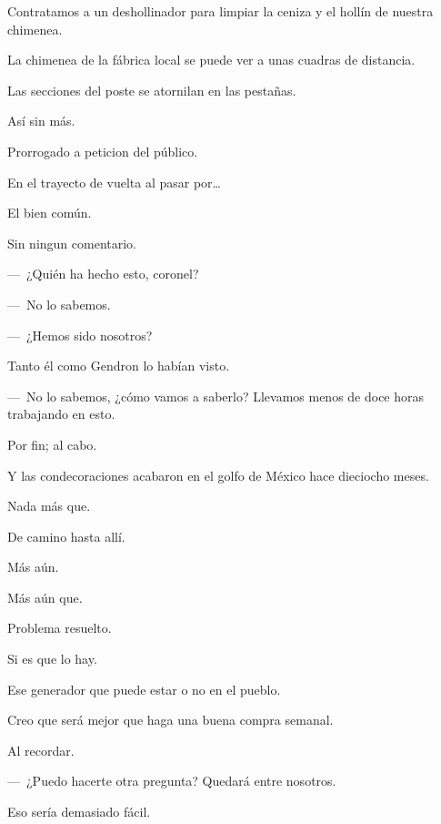 \sk
Contratamos a un deshollinador para limpiar la ceniza y el hollín de nuestra chimenea. 

\sk
La chimenea de la fábrica local se puede ver a unas cuadras de distancia. 

\sk
Las secciones del poste se atornilan en las pestañas.

\sk
Así sin más. 

\sk
Prorrogado a peticion del público. 

\sk
En el trayecto de vuelta al pasar por\ldots{} 

\sk
El bien común. 

\sk
Sin ningun comentario.

\sk
---~¿Quién ha hecho esto, coronel?

---~No lo sabemos.

---~¿Hemos sido nosotros?

\sk
Tanto él como Gendron lo habían visto.

\sk
---~No lo sabemos, ¿cómo vamos a saberlo? Llevamos menos de doce horas trabajando en esto.

\sk
Por fin; al cabo. 

\sk
Y las condecoraciones acabaron en el golfo de México hace dieciocho meses. 

\sk
Nada más que. 

\sk
De camino hasta allí. 

\sk
Más aún. 

\sk
Más aún que. 

\sk
Problema resuelto.

\sk
Si es que lo hay. 

\sk
Ese generador que puede estar o no en el pueblo.

\sk
Creo que será mejor que haga una buena compra semanal.

\sk
Al recordar. 

\sk
---~¿Puedo hacerte otra pregunta? Quedará entre nosotros. 

\sk
Eso sería demasiado fácil.

